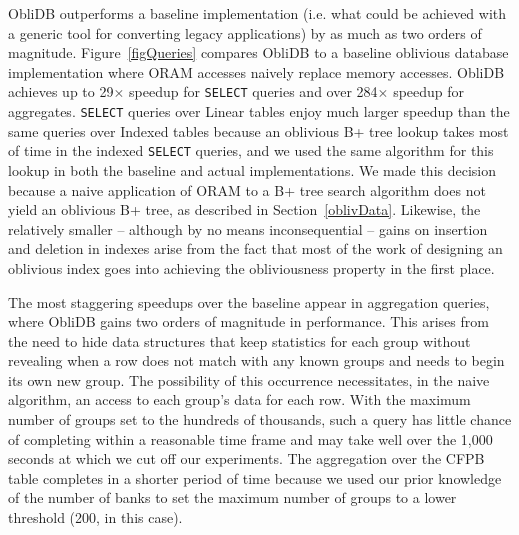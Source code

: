 \documentclass[letterpaper,twocolumn,10pt]{article}
\def\name/{ObliDB}
\begin{document}
\name/ outperforms a baseline implementation (i.e. what could be achieved with a generic tool for converting legacy applications) by as much as two orders of magnitude. Figure~\ref{figQueries} compares \name/ to a baseline oblivious database implementation where ORAM accesses naively replace memory accesses. \name/ achieves up to 29$\times$ speedup for \texttt{SELECT} queries and over 284$\times$ speedup for aggregates. \texttt{SELECT} queries over Linear tables enjoy much larger speedup than the same queries over Indexed tables because an oblivious B+ tree lookup takes most of time in the indexed \texttt{SELECT} queries, and we used the same algorithm for this lookup in both the baseline and actual implementations. We made this decision because a naive application of ORAM to a B+ tree search algorithm does not yield an oblivious B+ tree, as described in Section~\ref{oblivData}. Likewise, the relatively smaller -- although by no means inconsequential -- gains on insertion and deletion in indexes arise from the fact that most of the work of designing an oblivious index goes into achieving the obliviousness property in the first place. 

The most staggering speedups over the baseline appear in aggregation queries, where \name/ gains two orders of magnitude in performance. This arises from the need to hide data structures that keep statistics for each group without revealing when a row does not match with any known groups and needs to begin its own new group. The possibility of this occurrence necessitates, in the naive algorithm, an access to each group's data for each row. With the maximum number of groups set to the hundreds of thousands, such a query has little chance of completing within a reasonable time frame and may take well over the 1,000 seconds at which we cut off our experiments. The aggregation over the CFPB table completes in a shorter period of time because we used our prior knowledge of the number of banks to set the maximum number of groups to a lower threshold (200, in this case).
\end{document}
